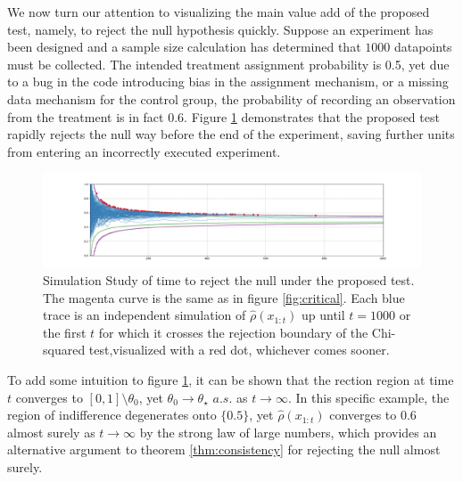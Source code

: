\documentclass[11pt]{article}
\begin{document}
  We now turn our attention to visualizing the main value add of the proposed test, namely, to reject the null hypothesis quickly. Suppose an experiment has been designed and a sample size calculation has determined that $1000$ datapoints must be collected. The intended treatment assignment probability is 0.5, yet due to a bug in the code introducing bias in the assignment mechanism, or a missing data mechanism for the control group, the probability of recording an observation from the treatment is in fact 0.6.
  Figure \ref{fig:ssrm_reject} demonstrates that the proposed test rapidly rejects the null way before the end of the experiment, saving further units from entering an incorrectly executed experiment.
      \begin{figure}[H]
  \centering
  \includegraphics[scale=0.35]{images/ssrm_reject.png}
  \caption{Simulation Study of time to reject the null under the proposed test. The magenta curve is the same as in figure \ref{fig:critical}. Each blue trace is an independent simulation of $\hat{\rho}(x_{1:t})$ up until $t=1000$ or the first $t$ for which it crosses the rejection boundary of the Chi-squared test,visualized with a red dot, whichever comes sooner. }
    \label{fig:ssrm_reject}
  \end{figure}
  \noindent To add some intuition to figure \ref{fig:ssrm_reject}, it can be shown that the rection region at time $t$ converges to $[0,1]\setminus \theta_0$, yet $\theta_0 \rightarrow \theta_\star$ $a.s.$ as $t\rightarrow \infty$. In this specific example, the region of indifference degenerates onto $\lbrace 0.5 \rbrace$, yet $\hat{\rho}(x_{1:t})$ converges to 0.6 almost surely as $t \rightarrow \infty$ by the strong law of large numbers, which provides an alternative argument to theorem \ref{thm:consistency} for rejecting the null almost surely.
\end{document}
